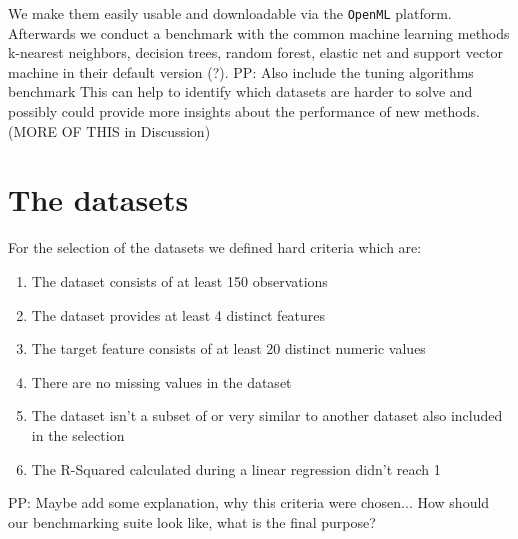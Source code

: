 \documentclass[a4paper]{article}
\begin{document}
We make them easily usable and downloadable via the \texttt{OpenML} platform.  
Afterwards we conduct a benchmark with the common machine learning methods k-nearest neighbors, decision trees, random forest, elastic net and support vector machine in their default version (?). \color{red} PP: Also include the tuning algorithms benchmark \color{black}
This can help to identify which datasets are harder to solve and possibly could provide more insights about the performance of new methods. (MORE OF THIS in Discussion)

  

\section{The datasets}

For the selection of the datasets we defined hard criteria which are: 
\begin{enumerate}
	\item The dataset consists of at least 150 observations 
	\item The dataset provides at least 4 distinct features 
	\item The target feature consists of at least 20 distinct numeric values 
	\item There are no missing values in the dataset 
	\item The dataset isn't a subset of or very similar to another dataset also included in the selection
	\item The R-Squared calculated during a linear regression didn't reach 1
\end{enumerate}

\color{red}
PP: Maybe add some explanation, why this criteria were chosen... How should our benchmarking suite look like, what is the final purpose? 
\color{black}
\end{document}

